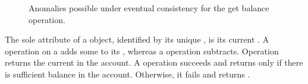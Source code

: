 \begin{figure}[t]
\centering
{}
\hfill
{}
\hfill
{}
\caption{Anomalies possible under eventual consistency for the get balance operation.}
\label{fig:cleanliness_examples}
\end{figure}

The sole attribute of a  object, identified by its unique
, is its current . A  operation
on a  adds some  to its ,
whereas a  operation subtracts. Operation 
returns the current  in the account. A 
operation succeeds and returns  only if there is sufficient
balance in the account. Otherwise, it fails and returns . 

